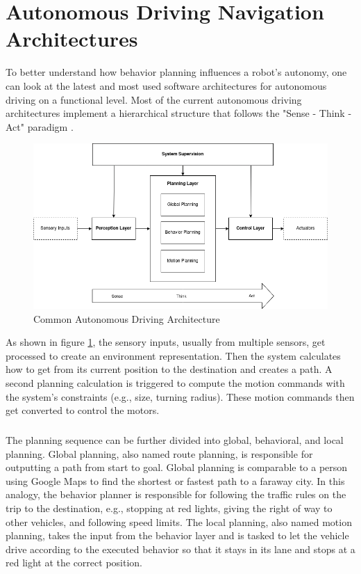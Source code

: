 

\section{Autonomous Driving Navigation Architectures}

To better understand how behavior planning influences a robot's autonomy, one can look at the latest and most used software architectures for autonomous driving on a functional level. 
Most of the current autonomous driving architectures implement a hierarchical structure that follows the "Sense - Think - Act" paradigm \cite{murphy2000}. 
\begin{figure}[ht]
	\includegraphics[width=1.0\textwidth]{images/autonomous_driving_architecture.png}
	\caption{Common Autonomous Driving Architecture \cite{brooks1986} \cite{velasco2020}}
	\label{fig:autonomous_driving_architecture}
\end{figure}
As shown in figure \ref{fig:autonomous_driving_architecture}, the sensory inputs, usually from multiple sensors, get processed to create an environment representation. Then the system calculates how to get from its current position to the destination and creates a path. A second planning calculation is triggered to compute the motion commands with the system's constraints (e.g., size, turning radius). These motion commands then get converted to control the motors. 

\subparagraph*{}
The planning sequence can be further divided into global, behavioral, and local planning. Global planning, also named route planning, is responsible for outputting a path from start to goal. Global planning is comparable to a person using Google Maps to find the shortest or fastest path to a faraway city. In this analogy, the behavior planner is responsible for following the traffic rules on the trip to the destination, e.g., stopping at red lights, giving the right of way to other vehicles, and following speed limits. The local planning, also named motion planning, takes the input from the behavior layer and is tasked to let the vehicle drive according to the executed behavior so that it stays in its lane and stops at a red light at the correct position\cite{reke2020}.

